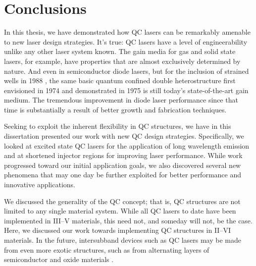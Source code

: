 %
%
%

\setcounter{chapter}{5}
\chapter[Conclusions]{Conclusions}

In this thesis, we have demonstrated how QC lasers can be remarkably amenable to new laser design strategies. It's true: QC lasers have a level of engineerability unlike any other laser system known.  The gain media for gas and solid state lasers, for example, have properties that are almost exclusively determined by nature.  And even in semiconductor diode lasers, but for the inclusion of strained wells in 1988 \cite{Yablonovitch:JLT:1988}, the same basic quantum confined double heterostructure first envisioned in 1974 \cite{Dingle:PRL:1974} and demonstrated in 1975 \cite{vanderZiel:APL:1975} is still today's state-of-the-art gain medium.  The tremendous improvement in diode laser performance since that time is substantially a result of better growth and fabrication techniques.

Seeking to exploit the inherent flexibility in QC structures, we have in this dissertation presented our work with new QC design strategies.  Specifically, we looked at excited state QC lasers for the application of long wavelength emission and at shortened injector regions for improving laser performance.  While work progressed toward our initial application goals, we also discovered several new phenomena that may one day be further exploited for better performance and innovative applications.

We discussed the generality of the QC concept; that is, QC structures are not limited to any single material system.  While all QC lasers to date have been implemented in III--V materials, this need not, and someday will not, be the case.  Here, we discussed our work towards implementing QC structures in II--VI materials.  In the future, intersubband devices such as QC lasers may be made from even more exotic structures, such as from alternating layers of semiconductor and oxide materials \cite{Choquette:JSTQE:1997}.


